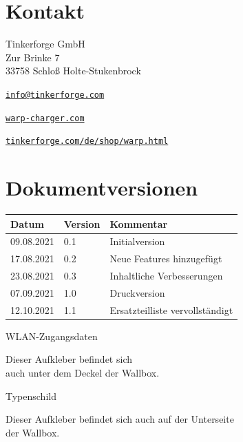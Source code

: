 \documentclass[a4paper,10pt]{article}
\begin{document}
\begin{multicols*}{2}
	\section{Kontakt}
	Tinkerforge GmbH\\ Zur Brinke 7\\ 33758 Schloß Holte-Stukenbrock
	\begin{description}[leftmargin=!,labelwidth=\widthof{\textbf{Website}}]
		\item[E-Mail] \href{mailto:info@tinkerforge.com}{\texttt{info@tinkerforge.com}}
		\item[Website] \href{https://warp-charger.com}{\texttt{warp-charger.com}}
		\item[Shop] \href{https://tinkerforge.com/de/shop/warp.html}{\texttt{tinkerforge.com/de/shop/warp.html}}
	\end{description}


	\section{Dokumentversionen}
	\begin{tabular}{lll}
		\toprule
		Datum      & Version & Kommentar                       \\
		\midrule
		09.08.2021 & 0.1     & Initialversion                  \\
		17.08.2021 & 0.2     & Neue Features hinzugefügt       \\
		23.08.2021 & 0.3     & Inhaltliche Verbesserungen      \\
		07.09.2021 & 1.0     & Druckversion                    \\
		12.10.2021 & 1.1     & Ersatzteilliste vervollständigt \\
		\bottomrule
	\end{tabular}
	\newpage
	\pagestyle{empty}
	\null
	\newpage
	\null
	\vfill
	WLAN-Zugangsdaten
	\begin{tcolorbox}[width=4.2cm,height=2.7cm, boxrule=0.25mm]

	\end{tcolorbox}
	Dieser Aufkleber befindet sich\\ auch unter dem Deckel der Wallbox.
	\columnbreak

	\null
	\vfill
	Typenschild
	\begin{tcolorbox}[width=7.8cm,height=4.1cm, boxrule=0.25mm]

	\end{tcolorbox}
	Dieser Aufkleber befindet sich auch auf der Unterseite\\ der Wallbox.
\end{multicols*}
\end{document}

